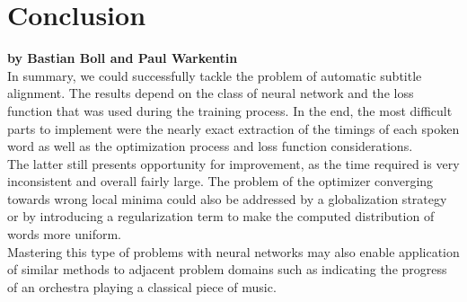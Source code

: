 \chapter{Conclusion}

\textbf{by Bastian Boll and Paul Warkentin} \\

In summary, we could successfully tackle the problem of automatic subtitle alignment. The results depend on the class of neural network and the loss function that was used during the training process. In the end, the most difficult parts to implement were the nearly exact extraction of the timings of each spoken word as well as the optimization process and loss function considerations. \\


The latter still presents  opportunity for improvement, as the time required is very inconsistent and overall fairly large. The problem of the optimizer converging towards wrong local minima could also be addressed by a globalization strategy or by introducing a regularization term to make the computed distribution of words more uniform.\\

Mastering this type of problems with neural networks may also enable application of similar methods to adjacent problem domains such as indicating the progress of an orchestra playing a classical piece of music.
